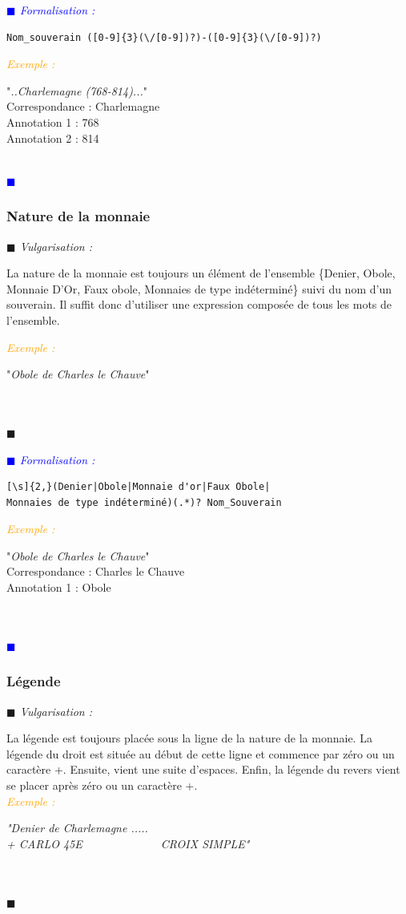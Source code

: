 \documentclass[a4paper, 11pt]{report}
\newenvironment{vulgarisation}
    {
    \textit{\textcolor{dark-blue}{$\blacksquare$  Vulgarisation : \\}}

    }
    {
    ~\\\textcolor{dark-blue}{$\blacksquare$}\\
    }
\newenvironment{formalisation}
    {
    \textit{\textcolor{blue}{$\blacksquare$  Formalisation : \\}}
    }
    {
    ~\\\textcolor{blue}{$\blacksquare$}\\
    }
\newenvironment{exemple}
    {
    \textit{\textcolor{orange}{
    Exemple : \\}}
    }
    {~\\
    }
\begin{document}
\begin{formalisation}
    \begin{verbatim}
Nom_souverain ([0-9]{3}(\/[0-9])?)-([0-9]{3}(\/[0-9])?)
    \end{verbatim}
    \begin{exemple}
        "\emph{..Charlemagne (768-814)...}" \\
        Correspondance : Charlemagne \\
        Annotation 1 : 768 \\
        Annotation 2 : 814
    \end{exemple}
\end{formalisation}

\subsubsection{Nature de la monnaie}
\begin{vulgarisation}
    La nature de la monnaie est toujours un élément de l'ensemble \{Denier, Obole, Monnaie D'Or, Faux obole, Monnaies de type indéterminé\} suivi du nom d'un souverain. Il suffit donc d'utiliser une expression composée de tous les mots de l'ensemble.
    
    \begin{exemple}
        "\emph{Obole de Charles le Chauve}" \\
    \end{exemple}
\end{vulgarisation}

\begin{formalisation}
    \begin{verbatim}
[\s]{2,}(Denier|Obole|Monnaie d'or|Faux Obole|
Monnaies de type indéterminé)(.*)? Nom_Souverain
    \end{verbatim}
    \begin{exemple}
        "\emph{Obole de Charles le Chauve}" \\
        Correspondance : Charles le Chauve \\
        Annotation 1 : Obole \\
    \end{exemple}
\end{formalisation}

\subsubsection{Légende}
\begin{vulgarisation}
    La légende est toujours placée sous la ligne de la nature de la monnaie. La légende du droit est située au début de cette ligne et commence par zéro ou un caractère +. Ensuite, vient une suite d'espaces. Enfin, la légende du revers vient se placer après zéro ou un caractère +.\\
    \begin{exemple}
        \emph{"Denier de Charlemagne ..... \\+ CARLO  45E~~~~~~~~~~~~~ CROIX SIMPLE"}\\
    \end{exemple}
\end{vulgarisation}
\end{document}

